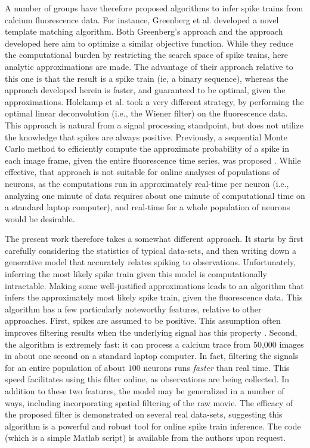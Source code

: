 A number of groups have therefore proposed algorithms to infer spike trains from calcium fluorescence data.  For instance, Greenberg et al. \cite{GreenbergKerr08} developed a novel template matching algorithm. %
Both Greenberg's approach and the approach developed here aim to optimize a similar objective function.  While they reduce the computational burden by restricting the search space of spike trains, here analytic approximations are made.  The advantage of their approach relative to this one is that the result is a spike train (ie, a binary sequence), whereas the approach developed herein is faster, and guaranteed to be optimal, given the approximations.  Holekamp et al. \cite{HolekampHoly08} took a very different strategy, by performing the optimal linear deconvolution (i.e., the Wiener filter) on the fluorescence data.  This approach is natural from a signal processing standpoint, but does not utilize the knowledge that spikes are always positive.  Previously, a sequential Monte Carlo method to efficiently compute the approximate probability of a spike in each image frame, given the entire fluorescence time series, was proposed \cite{VogelsteinPaninski09}.  While effective, that approach is not suitable for online analyses of populations of neurons, as the computations run in approximately real-time per neuron (i.e., analyzing one minute of data requires about one minute of computational time on a standard laptop computer), and real-time for a whole population of neurons would be desirable.


The present work therefore takes a somewhat different approach.  It starts by first carefully considering the statistics of typical data-sets, and then writing down a generative model that accurately relates spiking to observations. Unfortunately, inferring the most likely spike train given this model is computationally intractable.  Making some well-justified approximations leads to an algorithm that infers the approximately most likely spike train, given the fluorescence data.  This algorithm has a few particularly noteworthy features, relative to other approaches.  First, spikes are assumed to be positive.  This assumption often improves filtering results when the underlying signal has this property \cite{LeeSeung99, HuysPaninski06}.  Second, the algorithm is extremely fast: it can process a calcium trace from 50,000 images in about one second on a standard laptop computer. In fact, filtering the signals for an entire population of about $100$ neurons runs \emph{faster} than real time. This speed facilitates using this filter online, as observations are being collected. In addition to these two features, the model may be generalized in a number of ways, including incorporating spatial filtering of the raw movie. The efficacy of the proposed filter is demonstrated on several real data-sets, suggesting this algorithm is a powerful and robust tool for online spike train inference.  The code (which is a simple Matlab script) is available from the authors upon request.








